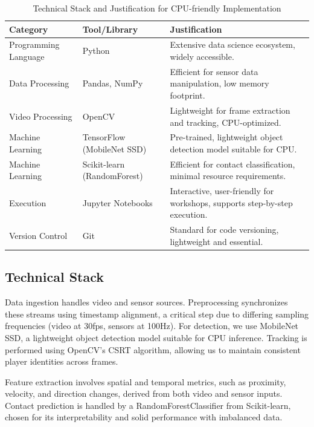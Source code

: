 \documentclass[conference]{IEEEtran}
\begin{document}
	\begin{table}[!t]
		\caption{Technical Stack and Justification for CPU-friendly Implementation}
		\centering
		\begin{tabular}{|p{3cm}|p{4cm}|p{6cm}|}
			\hline
			\textbf{Category} & \textbf{Tool/Library} & \textbf{Justification} \\
			\hline
			Programming Language & Python & Extensive data science ecosystem, widely accessible. \\
			\hline
			Data Processing & Pandas, NumPy & Efficient for sensor data manipulation, low memory footprint. \\
			\hline
			Video Processing & OpenCV & Lightweight for frame extraction and tracking, CPU-optimized. \\
			\hline
			Machine Learning & TensorFlow (MobileNet SSD) & Pre-trained, lightweight object detection model suitable for CPU. \\
			\hline
			Machine Learning & Scikit-learn (RandomForest) & Efficient for contact classification, minimal resource requirements. \\
			\hline
			Execution & Jupyter Notebooks & Interactive, user-friendly for workshops, supports step-by-step execution. \\
			\hline
			Version Control & Git & Standard for code versioning, lightweight and essential. \\
			\hline
			
		\end{tabular}
		\label{tab:tech_stack}
	\end{table}
	
	\subsection{Technical Stack}
	
	Data ingestion handles video and sensor sources. Preprocessing synchronizes these streams using timestamp alignment, a critical step due to differing sampling frequencies (video at 30fps, sensors at 100Hz). For detection, we use MobileNet SSD, a lightweight object detection model suitable for CPU inference. Tracking is performed using OpenCV's CSRT algorithm, allowing us to maintain consistent player identities across frames.
	
	Feature extraction involves spatial and temporal metrics, such as proximity, velocity, and direction changes, derived from both video and sensor inputs. Contact prediction is handled by a RandomForestClassifier from Scikit-learn, chosen for its interpretability and solid performance with imbalanced data.
	
\end{document}
